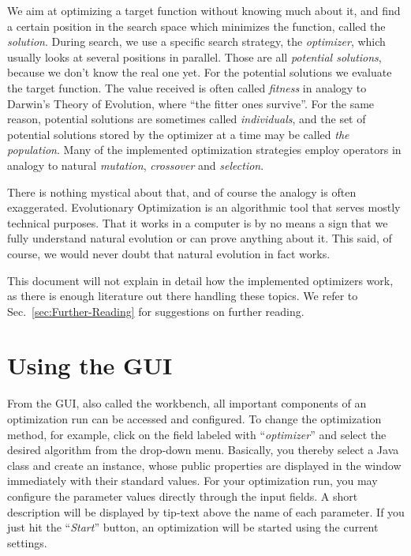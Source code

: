 We aim at optimizing a target function without knowing much about
it, and find a certain position in the search space which minimizes
the function, called the \emph{solution}. During search, we use a
specific search strategy, the \emph{optimizer}, which usually looks
at several positions in parallel. Those are all \emph{potential solutions},
because we don't know the real one yet. For the potential solutions
we evaluate the target function. The value received is often called
\emph{fitness} in analogy to Darwin's Theory of Evolution, where ``the
fitter ones survive''. For the same reason, potential solutions are
sometimes called \emph{individuals}, and the set of potential solutions
stored by the optimizer at a time may be called \emph{the} \emph{population}.
Many of the implemented optimization strategies employ operators in
analogy to natural \emph{mutation}, \emph{crossover} and \emph{selection}. 

There is nothing mystical about that, and of course the analogy is
often exaggerated. Evolutionary Optimization is an algorithmic tool
that serves mostly technical purposes. That it works in a computer
is by no means a sign that we fully understand natural evolution or
can prove anything about it. This said, of course, we would never
doubt that natural evolution in fact works.

This document will not explain in detail how the implemented optimizers
work, as there is enough literature out there handling these topics.
We refer to Sec.~\ref{sec:Further-Reading} for suggestions on further
reading.




\section{Using the GUI\label{sub:Quickly-Using-GUI}}

From the GUI, also called the  workbench, all important
components of an optimization run can be accessed and configured.
To change the optimization method, for example, click on the field
labeled with ``\emph{optimizer}'' and select the desired algorithm
from the drop-down menu. Basically, you thereby select a Java class
and create an instance, whose public properties are displayed in the
window immediately with their standard values. For your optimization
run, you may configure the parameter values directly through the input
fields. A short description will be displayed by tip-text above the
name of each parameter. If you just hit the ``\emph{Start}'' button,
an optimization will be started using the current settings. 

